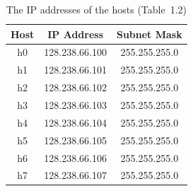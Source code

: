 \documentclass{UTNetLab}
\begin{document}
    \begin{center}
        \begin{minipage}{0.48\textwidth}
            \begin{flushleft}
                \begin{table}[H]
                    \caption{The IP addresses of the hosts (Table~1.2)}
                    \centering
                    \begin{tabular}{ c c c }
                        \hline \hline
                        Host & IP Address & Subnet Mask \\
                        \hline 
                        h0 & 128.238.66.100 & 255.255.255.0 \\
                        h1 & 128.238.66.101 & 255.255.255.0 \\
                        h2 & 128.238.66.102 & 255.255.255.0 \\
                        h3 & 128.238.66.103 & 255.255.255.0 \\
                        h4 & 128.238.66.104 & 255.255.255.0 \\
                        h5 & 128.238.66.105 & 255.255.255.0 \\
                        h6 & 128.238.66.106 & 255.255.255.0 \\
                        h7 & 128.238.66.107 & 255.255.255.0 \\
                        \hline \hline
                        \end{tabular}
                \end{table}
            \end{flushleft}
        \end{minipage}
        \begin{minipage}{0.48\textwidth}
            \begin{flushright}
                \begin{figure}[H]
                    \centering
\end{figure}
\end{flushright}
\end{minipage}
\end{center}
\end{document}
